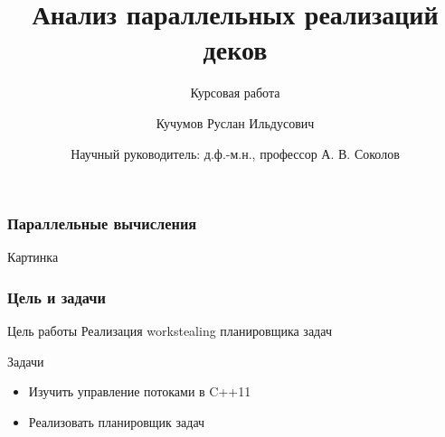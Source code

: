 \documentclass[hyperref={unicode}]{beamer}
\title[%
    Анализ деков
]{%
    Анализ параллельных реализаций деков
}
\subtitle{Курсовая работа}
\author[%
    Кучумов Руслан
]{%
    Кучумов Руслан Ильдусович
}
\date[%
    20.05.2015
]{%
    Научный руководитель: д.ф.-м.н., профессор А. В. Соколов
}
\institute[%
    ПетрГУ
]{%
    Петрозаводский государственный университет\\
    Кафедра информатики и математического обеспечения
}
\begin{document}
\begin{frame}
    \maketitle
\end{frame}

\begin{frame}
    \frametitle{Параллельные вычисления}



    Картинка
\end{frame}

\begin{frame}
    
    \frametitle{Цель и задачи}
    \begin{block}{Цель работы}
        Реализация workstealing планировщика задач
    \end{block}
    \begin{block}{Задачи}
        \begin{itemize}
            \item Изучить управление потоками в C++11
            \item Реализовать планировщик задач
        \end{itemize}
    \end{block}
\end{frame}
\end{document}
